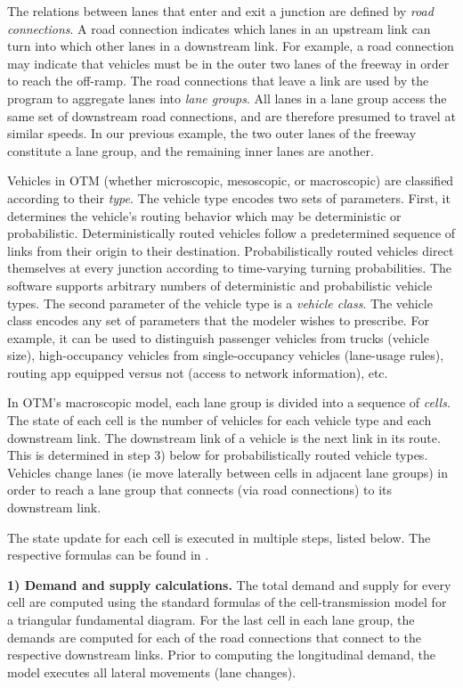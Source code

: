 The relations between lanes that enter and exit a junction are defined by \textit{road connections}. A road connection indicates which lanes in an upstream link can turn into which other lanes in a downstream link. For example, a road connection may indicate that vehicles must be in the outer two lanes of the freeway in order to reach the off-ramp. The road connections that leave a link are used by the program to aggregate lanes into \textit{lane groups}. All lanes in a lane group access the same set of downstream road connections, and are therefore presumed to travel at similar speeds. In our previous example, the two outer lanes of the freeway constitute a lane group, and the remaining inner lanes are another. 

Vehicles in OTM (whether microscopic, mesoscopic, or macroscopic) are classified according to their \textit{type}. The vehicle type encodes two sets of parameters. First, it determines the vehicle's routing behavior which may be deterministic or probabilistic. Deterministically routed vehicles follow a predetermined sequence of links from their origin to their destination. Probabilistically routed vehicles direct themselves at every junction according to time-varying turning probabilities. The software supports arbitrary numbers of deterministic and probabilistic vehicle types. The second parameter of the vehicle type is a \textit{vehicle class}. The vehicle class encodes any set of parameters that the modeler wishes to prescribe. For example, it can be used to distinguish passenger vehicles from trucks (vehicle size), high-occupancy vehicles from single-occupancy vehicles (lane-usage rules), routing app equipped versus not (access to network information), etc.

In OTM's macroscopic model, each lane group is divided into a sequence of \textit{cells}. The state of each cell is the number of vehicles for each vehicle type and each downstream link. The downstream link of a vehicle is the next link in its route. This is determined in step 3) below for probabilistically routed vehicle types. Vehicles change lanes (ie move laterally between cells in adjacent lane groups) in order to reach a lane group that connects (via road connections) to its downstream link. 

The state update for each cell is executed in multiple steps, listed below. The respective formulas can be found in \cite{Gomes2019OTM}.

\vspace{1em} \noindent \textbf{1) Demand and supply calculations.} The total demand and supply for every cell are computed using the standard formulas of the cell-transmission model for a triangular fundamental diagram. For the last cell in each lane group, the demands are computed for each of the road connections that connect to the respective downstream links. Prior to computing the longitudinal demand, the model executes all lateral movements (lane changes).  

